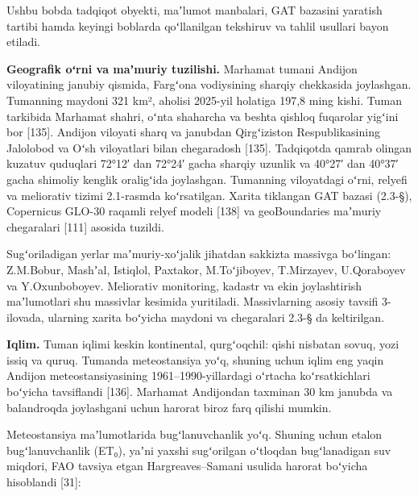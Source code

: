 
Ushbu bobda tadqiqot obyekti, maʼlumot manbalari, GAT bazasini yaratish
tartibi hamda keyingi boblarda qoʻllanilgan tekshiruv va tahlil usullari
bayon etiladi.


\textbf{Geografik oʻrni va maʼmuriy tuzilishi.} Marhamat tumani Andijon
viloyatining janubiy qismida, Fargʻona vodiysining sharqiy chekkasida
joylashgan. Tumanning maydoni 321 km², aholisi 2025-yil holatiga 197,8
ming kishi. Tuman tarkibida Marhamat shahri, oʻnta shaharcha va beshta
qishloq fuqarolar yigʻini bor {[}135{]}. Andijon viloyati sharq va
janubdan Qirgʻiziston Respublikasining Jalolobod va Oʻsh viloyatlari
bilan chegaradosh {[}135{]}. Tadqiqotda qamrab olingan kuzatuv quduqlari
72°12′ dan 72°24′ gacha sharqiy uzunlik va 40°27′ dan 40°37′ gacha
shimoliy kenglik oraligʻida joylashgan. Tumanning viloyatdagi oʻrni,
relyefi va meliorativ tizimi 2.1-rasmda koʻrsatilgan. Xarita tiklangan
GAT bazasi (2.3-§), Copernicus GLO-30 raqamli relyef modeli {[}138{]} va
geoBoundaries maʼmuriy chegaralari {[}111{]} asosida tuzildi.

Sugʻoriladigan yerlar maʼmuriy-xoʻjalik jihatdan sakkizta massivga
boʻlingan: Z.M.Bobur, Mashʼal, Istiqlol, Paxtakor, M.Toʻjiboyev,
T.Mirzayev, U.Qoraboyev va Y.Oxunboboyev. Meliorativ monitoring, kadastr
va ekin joylashtirish maʼlumotlari shu massivlar kesimida yuritiladi.
Massivlarning asosiy tavsifi 3-ilovada, ularning xarita boʻyicha maydoni
va chegaralari 2.3-§ da keltirilgan.



\textbf{Iqlim.} Tuman iqlimi keskin kontinental, qurgʻoqchil: qishi
nisbatan sovuq, yozi issiq va quruq. Tumanda meteostansiya yoʻq, shuning
uchun iqlim eng yaqin Andijon meteostansiyasining 1961--1990-yillardagi
oʻrtacha koʻrsatkichlari boʻyicha tavsiflandi {[}136{]}. Marhamat
Andijondan taxminan 30 km janubda va balandroqda joylashgani uchun
harorat biroz farq qilishi mumkin.

Meteostansiya maʼlumotlarida bugʻlanuvchanlik yoʻq. Shuning uchun etalon
bugʻlanuvchanlik (ET₀), yaʼni yaxshi sugʻorilgan oʻtloqdan bugʻlanadigan
suv miqdori, FAO tavsiya etgan Hargreaves--Samani usulida harorat
boʻyicha hisoblandi {[}31{]}:

